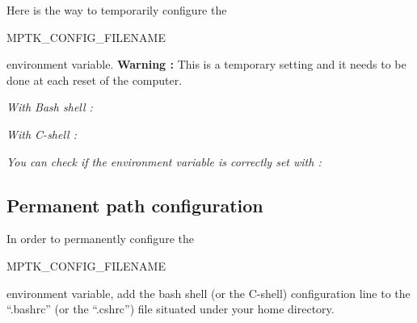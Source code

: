 Here is the way to temporarily configure the \begin{footnotesize}MPTK\_CONFIG\_FILENAME\end{footnotesize} environment variable. 
\textbf{Warning :} This is a temporary setting and it needs to be done at each reset of the computer.
\begin{my_itemize}
	\item \emph{With Bash shell :}
	\item \emph{With C-shell :}
	\item \emph{You can check if the environment variable is correctly set with :}
\end{my_itemize}


\subsection{Permanent path configuration}

In order to permanently configure the \begin{footnotesize}MPTK\_CONFIG\_FILENAME\end{footnotesize} environment variable, 
add  the bash shell (or the C-shell) configuration line to the ``.bashrc'' (or the ``.cshrc'') file situated under your home directory.



